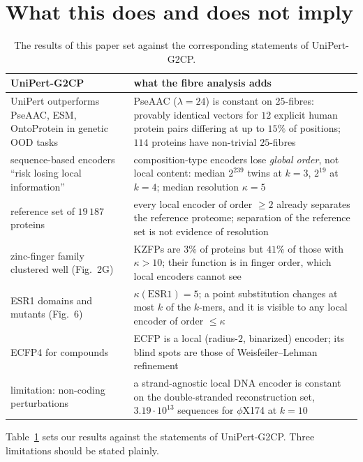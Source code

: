 \documentclass[11pt]{article}
\theoremstyle{plain}
\theoremstyle{definition}
\theoremstyle{remark}
\begin{document}
\section{What this does and does not imply}\label{sec:discussion}

\begin{table}[t]
\centering\small
\renewcommand{\arraystretch}{1.25}
\begin{tabular}{>{\raggedright\arraybackslash}p{}>{\raggedright\arraybackslash}p{}}
\toprule
UniPert-G2CP & what the fibre analysis adds\\
\midrule
UniPert outperforms PseAAC, ESM, OntoProtein in genetic OOD tasks & PseAAC ($\lambda=24$) is constant on
$25$-fibres: provably identical vectors for $12$ explicit human protein pairs differing at up to $15\%$
of positions; $114$ proteins have non-trivial $25$-fibres\\
sequence-based encoders ``risk losing local information'' & composition-type encoders lose
\emph{global order}, not local content: median $2^{239}$ twins at $k=3$, $2^{19}$ at $k=4$; median
resolution $\kappa=5$\\
reference set of $19\,187$ proteins & every local encoder of order $\ge2$ already separates the reference
proteome; separation of the reference set is not evidence of resolution\\
zinc-finger family clustered well (Fig.~2G) & KZFPs are $3\%$ of proteins but $41\%$ of those with
$\kappa>10$; their function is in finger order, which local encoders cannot see\\
ESR1 domains and mutants (Fig.~6) & $\kappa(\mathrm{ESR1})=5$; a point substitution changes at most $k$
of the $k$-mers, and it is visible to any local encoder of order $\le\kappa$\\
ECFP4 for compounds & ECFP is a local (radius-$2$, binarized) encoder; its blind spots are those of
Weisfeiler--Lehman refinement\\
limitation: non-coding perturbations & a strand-agnostic local DNA encoder is constant on the
double-stranded reconstruction set, $3.19\cdot10^{13}$ sequences for $\phi$X174 at $k=10$\\
\bottomrule
\end{tabular}
\caption{The results of this paper set against the corresponding statements of UniPert-G2CP.}\label{tab:vs}
\end{table}

Table~\ref{tab:vs} sets our results against the statements of UniPert-G2CP. Three limitations
should be stated plainly.
\end{document}
